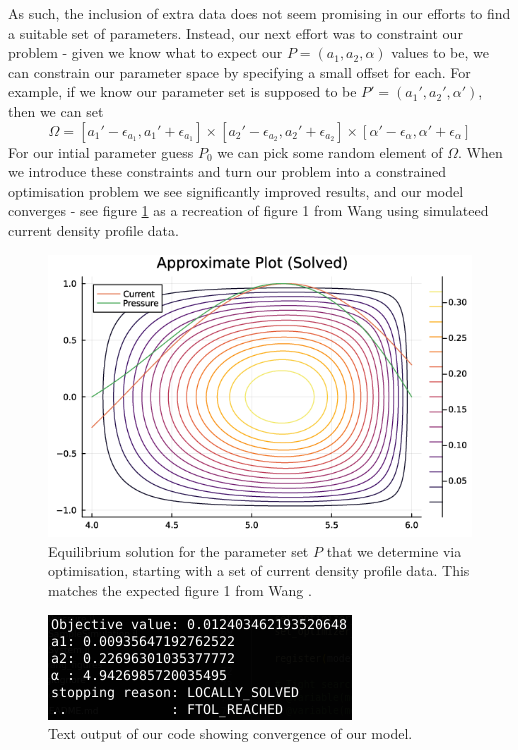 As such, the inclusion of extra data does not seem promising in our efforts to find a suitable set of parameters. Instead, 
our next effort was to constraint our problem - given we know what to expect our $P = (a_1, a_2, \alpha)$ values 
to be, we can constrain our parameter space by specifying a small offset for each. For example, 
if we know our parameter set is supposed to be $P' = (a_1', a_2', \alpha')$, then we can set
$$\Omega = [a_1' - \epsilon_{a_1}, a_1' + \epsilon_{a_1}] \times [a_2' - \epsilon_{a_2}, a_2' + \epsilon_{a_2}] \times [\alpha' - \epsilon_{\alpha}, \alpha' + \epsilon_{\alpha}]$$
For our intial parameter guess $P_0$ we can pick some random element of $\Omega$. When we introduce these constraints 
and turn our problem into a constrained optimisation problem we see significantly improved 
results, and our model converges - see figure \ref{solved-fig-1} as a recreation of figure 1 from Wang 
using simulateed current density profile data.

\begin{figure}[h!]
    \centering
    \includegraphics[scale=0.8]{imgs/c4/solved-fig-1.png}
    \caption{Equilibrium solution for the parameter set $P$ that we determine via optimisation, starting with a 
    set of current density profile data. This matches the expected figure 1 from Wang \cite{wang-analytic-solution}.}
    \label{solved-fig-1}
\end{figure}

\begin{figure}[h!]
    \centering
    \includegraphics[scale=1]{imgs/c4/converged.png}
    \caption{Text output of our code showing convergence of our model.}
\end{figure}


